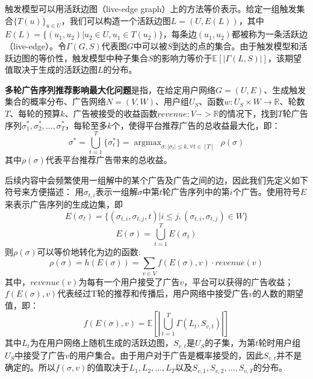 触发模型可以用活跃边图（live-edge graph）上的方法等价表示。给定一组触发集合$\{T(u)\}_{u\in U}$，我们可以构造一个活跃边图$L=(U,E(L))$，其中$E(L)=\{(u_1,u_2)|u_2\in U, u_1\in T(u_2)\}$，每条边$(u_1,u_2)$都被称为一条活跃边（live-edge）。令$\Gamma(G,S)$代表图$G$中可以被$S$到达的点的集合。由于触发模型和活跃边图的等价性，触发模型中种子集合$S$的影响力等价于$\mathbb{E}[|\Gamma(L,S)|]$，该期望值取决于生成的活跃边图$L$的分布。
\begin{definition}
{\bfseries 多轮广告序列推荐影响最大化问题}是指，在给定用户网络$G=(U,E)$、生成触发集合的概率分布、广告网络$N = (V, W)$、用户组$U_S$、函数$w:U_S \times W \to \mathbb{R}$、轮数$T$、每轮的预算$k$、广告被接受的收益函数$revenue:V->\mathbb{R}$的情况下，找到$T$轮广告序列$\sigma_1^*,\sigma_2^*,...,\sigma_T^*$，每轮至多$k$个，使得平台推荐广告的总收益最大化，即：
\begin{equation}
\sigma^* = \bigcup _{t=1} ^T \{\sigma_t^*\} = \mathop{\arg\max}_{\sigma:|\sigma_t|\le k,\forall t \in[T]} \ \ \rho(\sigma)
\end{equation}
\noindent 其中$\rho(\sigma)$代表平台推荐广告带来的总收益。
\end{definition}
后续内容中会频繁使用一组解中的某个广告及广告之间的边，因此我们先定义如下符号来方便描述：
用$\sigma_{t,i}$表示一组解$\sigma$中第$t$轮广告序列中的第$i$个广告。使用符号$E$来表示广告序列的生成边集，即
\begin{equation}
E(\sigma_t)=\{(\sigma_{t,i},\sigma_{t,j},t)|i \le j, (\sigma_{t,i},\sigma_{t,j})\in W\}
\end{equation}
\begin{equation}
E(\sigma)= \bigcup_{t=1}^T E(\sigma_t)
\end{equation}
\noindent 则$\rho(\sigma)$可以等价地转化为边的函数:
\begin{equation}
\label{equ:def_h}
\rho(\sigma) = h(E(\sigma)) = \sum_{v\in V}f(E(\sigma),v)\cdot revenue(v) 
\end{equation}
\noindent 其中，$revenue(v)$为每有一个用户接受了广告$v$，平台可以获得的广告收益；$f(E(\sigma),v)$代表经过T轮的推荐和传播后，用户网络中接受广告$v$的人数的期望值，即：
\begin{equation}
f(E(\sigma),v)=\mathbb{E}[|\bigcup_{t=1}^T\Gamma(L_t,S_{v,t})|]
\end{equation}
\noindent 其中$L_t$为在用户网络上随机生成的活跃边图，$S_{v,t}$是$U_S$的子集，为第$t$轮时用户组$U_S$中接受了广告$v$的用户集合。由于用户对于广告是概率接受的，因此$S_{v,t}$并不是确定的。所以$f(\sigma,v)$的值取决于$L_1,L_2,\ldots,L_T$以及$S_{v,1},S_{v,2},\ldots,S_{v,T}$的分布。


